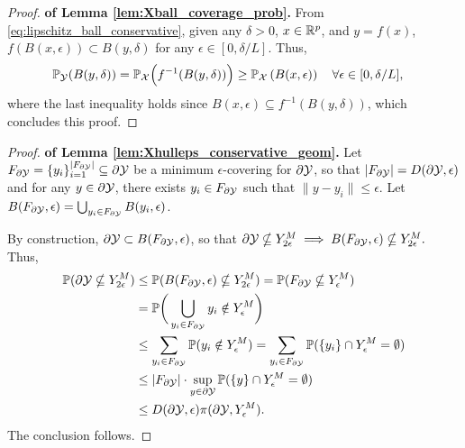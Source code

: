\documentclass[12pt]{l4dc2022} %
\begin{document}
% 
% 
% 
% 
% 
% 
% 
% 
% 
% 
% 
% 
% 
% 
% 
% 
% 
% 
% 
% 
% 
% 
% 
% 
% 
% 
% 
% 
% 
% 
% 
% 
% 
% 
% 
% 
% 
% 
% 
% 
% 
% 
% 
% 
% 
% 
% 
% 
% 



\begin{proof}\textbf{of Lemma \ref{lem:Xball_coverage_prob}.}
From \eqref{eq:lipschitz_ball_conservative}, 
given any $\delta>0$, 
 $x\in\mathbb{R}^p$, and 
 $y=f(x)$, 
$
f(B(x,\epsilon)) \subset B(y,\delta)$ for any $\epsilon\in[0,\delta/L]$.
% 
% 
Thus, \vspace{-3mm}
\begin{align*}
\Prob_{\Y}(B(y,\delta))
% 
% 
% 
% 
% 
&=
\Prob_\X\Big(f^{-1}(B(y,\delta))\Big)
\geq
\Prob_\X\left(
B(x,\epsilon)
\right)
\quad
\forall \epsilon\in[0,\delta/L],
\end{align*}
where the last inequality holds since $B(x,\epsilon) \subseteq f^{-1}(B(y,\delta))$,
which concludes this proof.
\end{proof}




\begin{proof}\textbf{of Lemma \ref{lem:Xhulleps_conservative_geom}.} 
% 
% 
% 
% 
% 
% 
% 
% 
% 
% 
% 
% 
% 
% 
% 
% 
% 
Let $F_{\partial\mathcal{Y}}=\{y_i\}_{i=1}^{|F_{\partial\mathcal{Y}}|}\subseteq\partial\mathcal{Y}$ be a minimum $\epsilon$-covering for $\partial\mathcal{Y}$, so that $|F_{\partial\mathcal{Y}}|=D(\partial\mathcal{Y},\epsilon)$ and 
 for any $y\in\partial\mathcal{Y}$, there exists $y_i\in F_{\partial\mathcal{Y}}$ such that $\|y-y_i\|\leq \epsilon$. 
 Let $B(F_{\partial\mathcal{Y}},\epsilon)=\bigcup_{y_i\in F_{\partial\mathcal{Y}}} B(y_i,\epsilon)$. 
 
 
 
By construction, $\partial\mathcal{Y}\subset B(F_{\partial\mathcal{Y}},\epsilon)$,
so that 
$
\partial\mathcal{Y}\nsubseteq Y_{2\epsilon}^M\implies
B(F_{\partial\mathcal{Y}},\epsilon)\nsubseteq Y_{2\epsilon}^M. 
$
Thus, 
\begin{align*}
\mathbb{P}(\partial\mathcal{Y}\nsubseteq Y_{2\epsilon}^M)
&\leq 
\mathbb{P}(B(F_{\partial\mathcal{Y}},\epsilon)\nsubseteq Y_{2\epsilon}^M)
=
\mathbb{P}(F_{\partial\mathcal{Y}}\nsubseteq Y_\epsilon^M)
\\
&=
\mathbb{P}\bigg(\bigcup_{y_i\in F_{\partial\mathcal{Y}}} y_i\notin Y_\epsilon^M\bigg)
\\
&\leq 
\sum_{y_i\in F_{\partial\mathcal{Y}}}\mathbb{P}(y_i\notin Y_\epsilon^M)
=
\sum_{y_i\in F_{\partial\mathcal{Y}}}
\mathbb{P}(\{y_i\}\cap Y_\epsilon^M = \emptyset)
\\
&\leq 
|F_{\partial\mathcal{Y}}| \cdot
\sup_{y\in\partial\mathcal{Y}}\mathbb{P}(\{y\}\cap Y_{\epsilon}^M = \emptyset)
\\
&\leq 
D(\partial\mathcal{Y},\epsilon)\pi(\partial\mathcal{Y},Y_{\epsilon}^M).
\end{align*}
The conclusion follows.
\end{proof}
\end{document}
